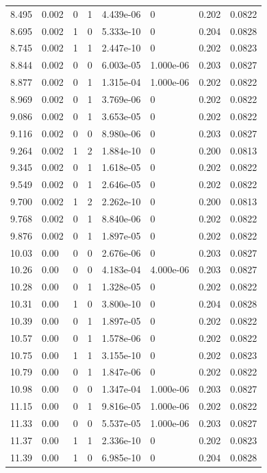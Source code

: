\documentclass[preview]{standalone}
\begin{document}
{{{\begin{tabular}{L{1.2cm}C{1.2cm} C{0.3cm}C{0.5cm} C{1.4cm}C{1.4cm} C{1.4cm}C{1.4cm}}
  8.495  &  0.002  & 0     &  1 &  4.439e-06  & 0  & 0.202 &  0.0822   \\ 
  8.695  &  0.002  & 1     &  0 &  5.333e-10  & 0  & 0.204 &  0.0828   \\ 
  8.745  &  0.002  & 1     &  1 &  2.447e-10  & 0  & 0.202 &  0.0823   \\ 
  8.844  &  0.002  & 0     &  0 &  6.003e-05  & 1.000e-06  & 0.203 &  0.0827   \\ 
  8.877  &  0.002  & 0     &  1 &  1.315e-04  & 1.000e-06  & 0.202 &  0.0822   \\ 
  8.969  &  0.002  & 0     &  1 &  3.769e-06  & 0  & 0.202 &  0.0822   \\ 
  9.086  &  0.002  & 0     &  1 &  3.653e-05  & 0  & 0.202 &  0.0822   \\ 
  9.116  &  0.002  & 0     &  0 &  8.980e-06  & 0  & 0.203 &  0.0827   \\ 
  9.264  &  0.002  & 1     &  2 &  1.884e-10  & 0  & 0.200 &  0.0813   \\ 
  9.345  &  0.002  & 0     &  1 &  1.618e-05  & 0  & 0.202 &  0.0822   \\ 
  9.549  &  0.002  & 0     &  1 &  2.646e-05  & 0  & 0.202 &  0.0822   \\ 
  9.700  &  0.002  & 1     &  2 &  2.262e-10  & 0  & 0.200 &  0.0813   \\ 
  9.768  &  0.002  & 0     &  1 &  8.840e-06  & 0  & 0.202 &  0.0822   \\ 
  9.876  &  0.002  & 0     &  1 &  1.897e-05  & 0  & 0.202 &  0.0822   \\ 
  10.03  &  0.00  & 0     &  0 &  2.676e-06  & 0  & 0.203 &  0.0827   \\ 
  10.26  &  0.00  & 0     &  0 &  4.183e-04  & 4.000e-06  & 0.203 &  0.0827   \\ 
  10.28  &  0.00  & 0     &  1 &  1.328e-05  & 0  & 0.202 &  0.0822   \\ 
  10.31  &  0.00  & 1     &  0 &  3.800e-10  & 0  & 0.204 &  0.0828   \\ 
  10.39  &  0.00  & 0     &  1 &  1.897e-05  & 0  & 0.202 &  0.0822   \\ 
  10.57  &  0.00  & 0     &  1 &  1.578e-06  & 0  & 0.202 &  0.0822   \\ 
  10.75  &  0.00  & 1     &  1 &  3.155e-10  & 0  & 0.202 &  0.0823   \\ 
  10.79  &  0.00  & 0     &  1 &  1.847e-06  & 0  & 0.202 &  0.0822   \\ 
  10.98  &  0.00  & 0     &  0 &  1.347e-04  & 1.000e-06  & 0.203 &  0.0827   \\ 
  11.15  &  0.00  & 0     &  1 &  9.816e-05  & 1.000e-06  & 0.202 &  0.0822   \\ 
  11.33  &  0.00  & 0     &  0 &  5.537e-05  & 1.000e-06  & 0.203 &  0.0827   \\ 
  11.37  &  0.00  & 1     &  1 &  2.336e-10  & 0  & 0.202 &  0.0823   \\ 
  11.39  &  0.00  & 1     &  0 &  6.985e-10  & 0  & 0.204 &  0.0828   \\ 
\hline 
\end{tabular} 

}}}
\end{document}
